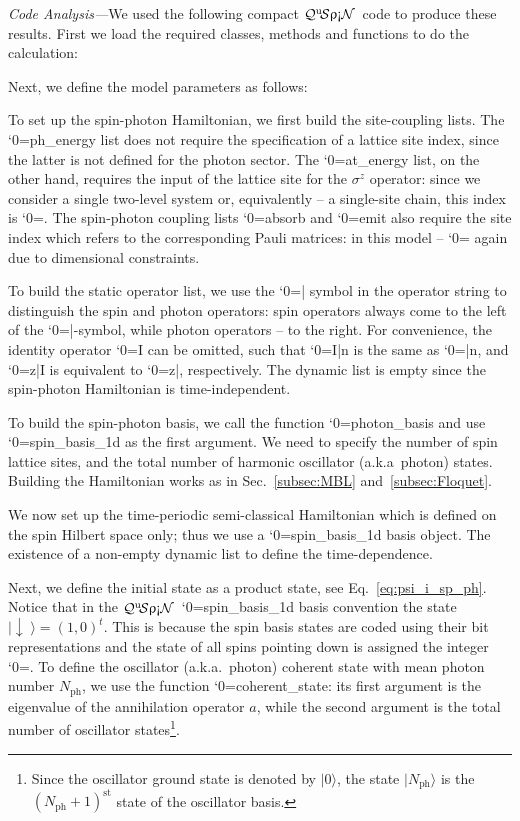 \documentclass{SciPost}
\newcommand\0{\scalebox{-1}[1]{0}}
\let\svttfamily\ttfamily
\renewcommand\ttfamily{\svttfamily\catcode`0=\active }
\renewcommand\texttt{\bgroup\ttfamily\texttthelp}
\def\texttthelp#1{#1\egroup}
\newcommand{\qspin}{$\mathcal{Q}^{\mathrm{u}}\!\mathcal{S}\uprho\mathrm{\text{\textexclamdown}}\mathcal{N}$}
\begin{document}
\emph{Code Analysis---}We used the following compact \qspin\ code to produce these results. First we load the required classes, methods and functions to do the calculation:

%
Next, we define the model parameters as follows:

%
To set up the spin-photon Hamiltonian, we first build the site-coupling lists. The \texttt{ph\_energy} list does not require the specification of a lattice site index, since the latter is not defined for the photon sector. The \texttt{at\_energy} list, on the other hand, requires the input of the lattice site for the $\sigma^z$ operator: since we consider a single two-level system or, equivalently -- a single-site chain, this index is \texttt{0}. The spin-photon coupling lists \texttt{absorb} and \texttt{emit} also require the site index which refers to the corresponding Pauli matrices: in this model -- \texttt{0} again due to dimensional constraints.
%  

To build the static operator list, we use the \texttt{|} symbol in the operator string to distinguish the spin and photon operators: spin operators always come to the left of the \texttt{|}-symbol, while photon operators -- to the right. For convenience, the identity operator \texttt{I} can be omitted, such that \texttt{I|n} is the same as \texttt{|n}, and \texttt{z|I} is equivalent to \texttt{z|}, respectively. The dynamic list is empty since the spin-photon Hamiltonian is time-independent.
%  

To build the spin-photon basis, we call the function \texttt{photon\_basis} and use \texttt{spin\_basis\_1d} as the first argument. We need to specify the number of spin lattice sites, and the total number of harmonic oscillator (a.k.a~photon) states. Building the Hamiltonian works as in Sec.~\ref{subsec:MBL} and~\ref{subsec:Floquet}.

We now set up the time-periodic semi-classical Hamiltonian which is defined on the spin Hilbert space only; thus we use a \texttt{spin\_basis\_1d} basis object. The existence of a non-empty dynamic list to define the time-dependence.
%

Next, we define the initial state as a product state, see Eq.~\eqref{eq:psi_i_sp_ph}. Notice that in the \qspin\ \texttt{spin\_basis\_1d} basis convention the state $|\downarrow\;\rangle = (1,0)^t$. This is because the spin basis states are coded using their bit representations and the state of all spins pointing down is assigned the integer \texttt{0}. To define the oscillator (a.k.a.~photon) coherent state with mean photon number $N_\mathrm{ph}$, we use the function \texttt{coherent\_state}: its first argument is the eigenvalue of the annihilation operator $a$, while the second argument is the total number of oscillator states\footnote{Since the oscillator ground state is denoted by $|0\rangle$, the state $|N_\mathrm{ph}\rangle$ is the $(N_\mathrm{ph}+1)^\mathrm{st}$ state of the oscillator  basis.}.
\end{document}
